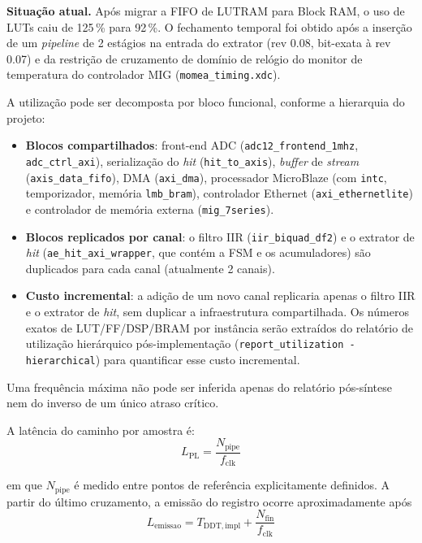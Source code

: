 \textbf{Situação atual.} Após migrar a FIFO de LUTRAM para Block RAM, o uso de LUTs caiu de 125\,\% para 92\,\%. O fechamento temporal foi obtido após a inserção de um \textit{pipeline} de 2 estágios na entrada do extrator (rev 0.08, bit-exata à rev 0.07) e da restrição de cruzamento de domínio de relógio do monitor de temperatura do controlador MIG (\texttt{momea\_timing.xdc}).

A utilização pode ser decomposta por bloco funcional, conforme a hierarquia do projeto:

\begin{itemize}
	\item \textbf{Blocos compartilhados}: front-end ADC (\texttt{adc12\_frontend\_1mhz}, \texttt{adc\_ctrl\_axi}), serialização do \textit{hit} (\texttt{hit\_to\_axis}), \textit{buffer} de \textit{stream} (\texttt{axis\_data\_fifo}), DMA (\texttt{axi\_dma}), processador MicroBlaze (com \texttt{intc}, temporizador, memória \texttt{lmb\_bram}), controlador Ethernet (\texttt{axi\_ethernetlite}) e controlador de memória externa (\texttt{mig\_7series}).
	\item \textbf{Blocos replicados por canal}: o filtro IIR (\texttt{iir\_biquad\_df2}) e o extrator de \textit{hit} (\texttt{ae\_hit\_axi\_wrapper}, que contém a FSM e os acumuladores) são duplicados para cada canal (atualmente 2 canais).
	\item \textbf{Custo incremental}: a adição de um novo canal replicaria apenas o filtro IIR e o extrator de \textit{hit}, sem duplicar a infraestrutura compartilhada. Os números exatos de LUT/FF/DSP/BRAM por instância serão extraídos do relatório de utilização hierárquico pós-implementação (\texttt{report\_utilization -hierarchical}) para quantificar esse custo incremental.
\end{itemize}

Uma frequência máxima não pode ser inferida apenas do relatório pós-síntese nem do inverso de um único atraso crítico.

A latência do caminho por amostra é:
\begin{equation}
	L_{\mathrm{PL}} = \frac{N_{\mathrm{pipe}}}{f_{\mathrm{clk}}}
	\label{v2:eq:latencia_pl}
\end{equation}

\noindent
em que \(N_{\mathrm{pipe}}\) é medido entre pontos de referência explicitamente definidos. A partir do último cruzamento, a emissão do registro ocorre aproximadamente após
\begin{equation}
	L_{\mathrm{emissao}} = T_{\mathrm{DDT,impl}} + \frac{N_{\mathrm{fin}}}{f_{\mathrm{clk}}}
	\label{v2:eq:latencia_emissao_registro}
\end{equation}

